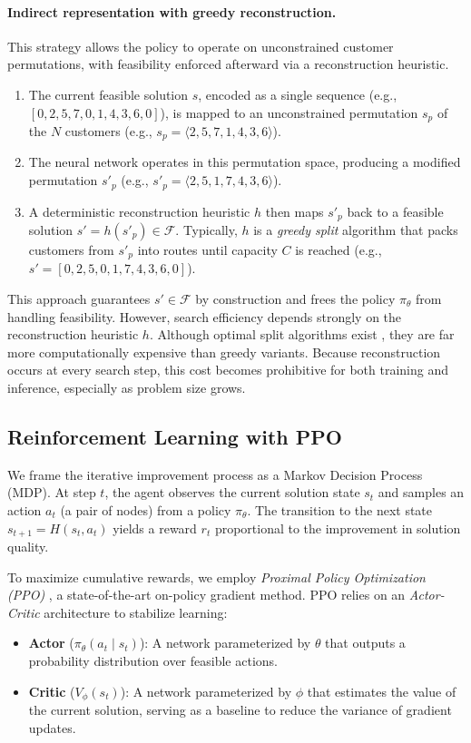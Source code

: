 \documentclass[letterpaper]{article} %
\begin{document}
\paragraph{Indirect representation with greedy reconstruction.}
This strategy allows the policy to operate on unconstrained customer permutations, with feasibility enforced afterward via a reconstruction heuristic.
\begin{enumerate}
    \item The current feasible solution $s$, encoded as a single sequence (e.g., $[0,2,5,7,0,1,4,3,6,0]$), is mapped to an unconstrained permutation $s_p$ of the $N$ customers (e.g., $s_p = \langle 2,5,7,1,4,3,6 \rangle$).
    \item The neural network operates in this permutation space, producing a modified permutation $s'_p$ (e.g., $s'_p = \langle 2,5,1,7,4,3,6 \rangle$).
    \item A deterministic reconstruction heuristic $h$ then maps $s'_p$ back to a feasible solution $s' = h(s'_p) \in \mathcal{F}$.
    Typically, $h$ is a \textit{greedy split} algorithm that packs customers from $s'_p$ into routes until capacity $C$ is reached (e.g., $s' = [0,2,5,0,1,7,4,3,6,0]$).
\end{enumerate}

This approach guarantees $s' \in \mathcal{F}$ by construction and frees the policy $\pi_\theta$ from handling feasibility. However, search efficiency depends strongly on the reconstruction heuristic $h$. Although optimal split algorithms exist \cite{vidal_technical_2016}, they are far more computationally expensive than greedy variants. Because reconstruction occurs at every search step, this cost becomes prohibitive for both training and inference, especially as problem size grows.

\subsection{Reinforcement Learning with PPO}
\label{sec:reinforcement_learning}

We frame the iterative improvement process as a Markov Decision Process (MDP). At step $t$, the agent observes the current solution state $s_t$ and samples an action $a_t$ (a pair of nodes) from a policy $\pi_\theta$. The transition to the next state $s_{t+1} = H(s_t, a_t)$ yields a reward $r_t$ proportional to the improvement in solution quality.

To maximize cumulative rewards, we employ \textit{Proximal Policy Optimization (PPO)} \cite{schulman_proximal_2017}, a state-of-the-art on-policy gradient method. PPO relies on an \textit{Actor-Critic} architecture to stabilize learning:
\begin{itemize}
    \item \textbf{Actor} ($\pi_{\theta}(a_t \mid s_t)$): A network parameterized by $\theta$ that outputs a probability distribution over feasible actions.
    \item \textbf{Critic} ($V_{\phi}(s_t)$): A network parameterized by $\phi$ that estimates the value of the current solution, serving as a baseline to reduce the variance of gradient updates.
\end{itemize}
\end{document}
